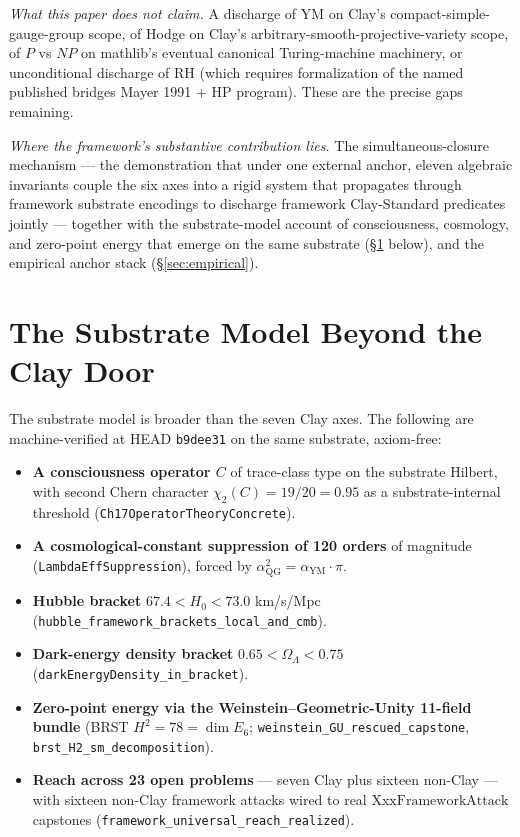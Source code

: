 \documentclass[11pt,a4paper]{article}
\theoremstyle{plain}
\theoremstyle{definition}
\theoremstyle{remark}
\newcommand{\aYM}{\alpha_{\mathrm{YM}}}
\newcommand{\aQG}{\alpha_{\mathrm{QG}}}
\newcommand{\code}[1]{\texttt{#1}}
\begin{document}
\emph{What this paper does not claim.} A discharge of YM on
Clay's compact-simple-gauge-group scope, of Hodge on Clay's
arbitrary-smooth-projective-variety scope, of $P$ vs $NP$ on
mathlib's eventual canonical Turing-machine machinery, or
unconditional discharge of RH (which requires formalization of
the named published bridges Mayer 1991 + HP program). These
are the precise gaps remaining.

\emph{Where the framework's substantive contribution lies.} The
simultaneous-closure mechanism --- the demonstration that
under one external anchor, eleven algebraic invariants couple
the six axes into a rigid system that propagates
through framework substrate encodings to discharge framework
Clay-Standard predicates jointly --- together with the
substrate-model account of consciousness, cosmology, and zero-point
energy that emerge on the same substrate (\S\ref{sec:cargo} below),
and the empirical anchor stack (\S\ref{sec:empirical}).

\section{The Substrate Model Beyond the Clay Door}
\label{sec:cargo}

The substrate model is broader than the seven Clay axes. The
following are machine-verified at HEAD \code{b9dee31} on the
same substrate, axiom-free:

\begin{itemize}
\item \textbf{A consciousness operator $C$} of trace-class type
on the substrate Hilbert, with second Chern character
$\chi_{2}(C) = 19/20 = 0.95$ as a substrate-internal threshold
(\code{Ch17OperatorTheoryConcrete}).
\item \textbf{A cosmological-constant suppression of 120
orders} of magnitude (\code{LambdaEffSuppression}), forced by
$\aQG^{2} = \aYM \cdot \pi$.
\item \textbf{Hubble bracket} $67.4 < H_{0} < 73.0$ km/s/Mpc
(\code{hubble\_framework\_brackets\_local\_and\_cmb}).
\item \textbf{Dark-energy density bracket} $0.65 < \Omega_{\Lambda} < 0.75$
(\code{darkEnergyDensity\_in\_bracket}).
\item \textbf{Zero-point energy via the Weinstein--Geometric-Unity
11-field bundle} (BRST $H^{2} = 78 = \dim E_{6}$;
\code{weinstein\_GU\_rescued\_capstone},
\code{brst\_H2\_sm\_decomposition}).
\item \textbf{Reach across 23 open problems} --- seven Clay
plus sixteen non-Clay --- with sixteen non-Clay framework
attacks wired to real $\mathrm{XxxFrameworkAttack}$ capstones
(\code{framework\_universal\_reach\_realized}).
\end{itemize}
\end{document}

